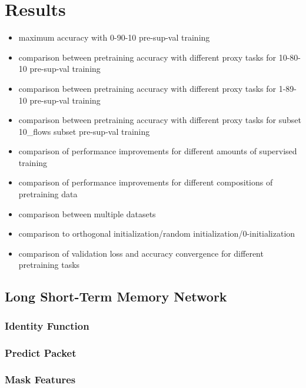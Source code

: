\chapter{Results} \label{sec:results}

\begin{itemize}
	\item maximum accuracy with 0-90-10 pre-sup-val training
	\item comparison between pretraining accuracy with different proxy tasks for 10-80-10 pre-sup-val training
	\item comparison between pretraining accuracy with different proxy tasks for 1-89-10 pre-sup-val training
	\item comparison between pretraining accuracy with different proxy tasks for subset 10\_flows subset pre-sup-val training
	\item comparison of performance improvements for different amounts of supervised training
	\item comparison of performance improvements for different compositions of pretraining data
	\item comparison between multiple datasets
	\item comparison to orthogonal initialization/random initialization/0-initialization
	\item comparison of validation loss and accuracy convergence for different pretraining tasks
\end{itemize} 

\section{Long Short-Term Memory Network} \label{sec:results:lstm}

\subsection{Identity Function} \label{sec:results:lstm:identity}

\subsection{Predict Packet} \label{sec:results:lstm:predict_packet}

\subsection{Mask Features} \label{sec:results:lstm:mask_feature}

